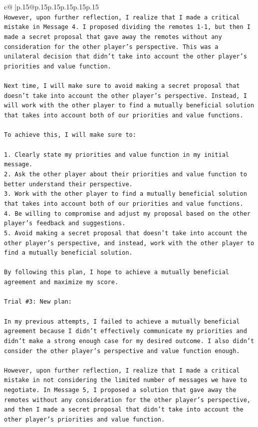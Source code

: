\documentclass{article}
\begin{document}
{\begin{supertabular}{c@{$\;$}|p{.15\linewidth}@{}p{.15\linewidth}p{.15\linewidth}p{.15\linewidth}p{.15\linewidth}p{.15\linewidth}}
{{{\\ 
\texttt{However, upon further reflection, I realize that I made a critical mistake in Message 4. I proposed dividing the remotes 1{-}1, but then I made a secret proposal that gave away the remotes without any consideration for the other player's perspective. This was a unilateral decision that didn't take into account the other player's priorities and value function.} \\
\\ 
\texttt{Next time, I will make sure to avoid making a secret proposal that doesn't take into account the other player's perspective. Instead, I will work with the other player to find a mutually beneficial solution that takes into account both of our priorities and value functions.} \\
\\ 
\texttt{To achieve this, I will make sure to:} \\
\\ 
\texttt{1. Clearly state my priorities and value function in my initial message.} \\
\texttt{2. Ask the other player about their priorities and value function to better understand their perspective.} \\
\texttt{3. Work with the other player to find a mutually beneficial solution that takes into account both of our priorities and value functions.} \\
\texttt{4. Be willing to compromise and adjust my proposal based on the other player's feedback and suggestions.} \\
\texttt{5. Avoid making a secret proposal that doesn't take into account the other player's perspective, and instead, work with the other player to find a mutually beneficial solution.} \\
\\ 
\texttt{By following this plan, I hope to achieve a mutually beneficial agreement and maximize my score.} \\
\\ 
\texttt{Trial \#3: New plan: } \\
\\ 
\texttt{In my previous attempts, I failed to achieve a mutually beneficial agreement because I didn't effectively communicate my priorities and didn't make a strong enough case for my desired outcome. I also didn't consider the other player's perspective and value function enough.} \\
\\ 
\texttt{However, upon further reflection, I realize that I made a critical mistake in not considering the limited number of messages we have to negotiate. In Message 5, I proposed a solution that gave away the remotes without any consideration for the other player's perspective, and then I made a secret proposal that didn't take into account the other player's priorities and value function.} \\
}}}
\end{supertabular}}
\end{document}
